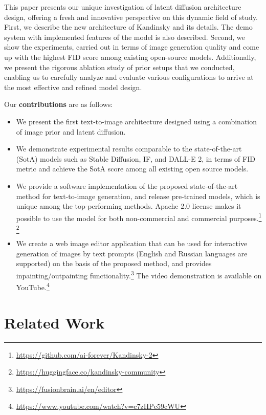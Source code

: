 \documentclass[11pt]{article}
\begin{document}
This paper presents our unique investigation of latent diffusion architecture design, offering a fresh and innovative perspective on this dynamic field of study. First, we describe the new architecture of Kandinsky and its details. The demo system with implemented features of the model is also described. Second, we show the experiments, carried out in terms of image generation quality and come up with the highest FID score among existing open-source models. Additionally, we present the rigorous ablation study of prior setups that we conducted, enabling us to carefully analyze and evaluate various configurations to arrive at the most effective and refined model design.

Our \textbf{contributions} are as follows:
  \begin{itemize}

    \item We present the first text-to-image architecture designed using a combination of image prior and latent diffusion.
    
    \item We demonstrate experimental results comparable to the state-of-the-art (SotA) models such as Stable Diffusion, IF, and DALL-E 2, in terms of FID metric and achieve the SotA score among all existing open source models.
  
    \item We provide a software implementation of the proposed state-of-the-art method for text-to-image generation, and release pre-trained models, which is unique among the top-performing methods. Apache 2.0 license makes it possible to use the model for both non-commercial and commercial purposes.\footnote{\url{https://github.com/ai-forever/Kandinsky-2}} \footnote{\url{https://huggingface.co/kandinsky-community}}  

    \item We create a web image editor application that can be used for interactive generation of images by text prompts (English and Russian languages are supported) on the basis of the proposed method, and provides inpainting/outpainting functionality.\footnote{\url{https://fusionbrain.ai/en/editor}}
    The video demonstration is available on YouTube.\footnote{\url{https://www.youtube.com/watch?v=c7zHPc59cWU}} 
    
  \end{itemize}

\section{Related Work}
\end{document}
